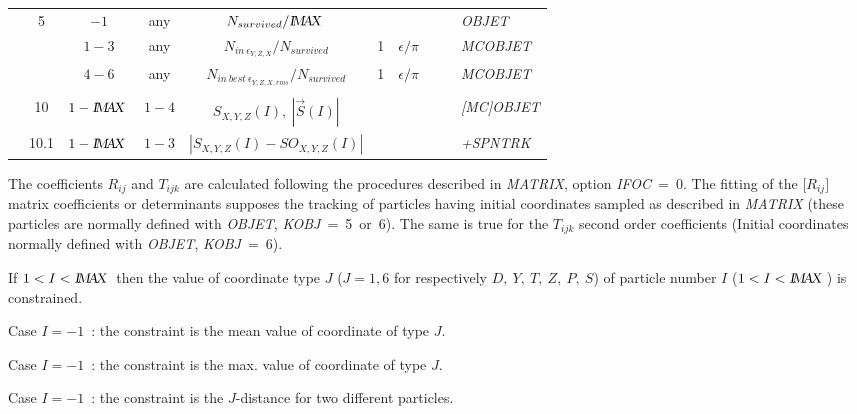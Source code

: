 \begin{center}
{\begin{tabular}{|>{\bfseries}p{\LL}|c|c|c|c|c|c|c|c|p{\LL}|}
			    & 5 & $-1$ & any &  $N_{survived}/\textsl{I\!M\!A\!X }$  
         & & & & & \textsl{OBJET} \\
			\multicolumn{1}{|c|}{\textbf{particles}} &  & $1 - 3$ & any 
                & $N_{in~\epsilon_{Y,Z,X}}/ N_{survived}$ 
         & 1 & $\epsilon/ \pi $& & & \textsl{MCOBJET}   \\
			    &  & $4 - 6$ & any 
                & $N_{in~best~\epsilon_{Y,Z,X,rms}}/ N_{survived}$ 
         & 1 & $\epsilon/ \pi $& & & \textsl{MCOBJET}   \\
                           & & & & & & & & &  \\
%
			\multicolumn{1}{|c|}{\textbf{Spin}}
			    & 10 & $1 - \textsl{I\!M\!A\!X }$ & $1 - 4$  & $  S_{X,Y,Z}(I), ~ |\vec S(I)| $  
         & & & & & \textsl{[MC]OBJET}   \\
			\multicolumn{1}{|c|}{\textbf{  }}
			    & 10.1 & $1 -\textsl{I\!M\!A\!X }$ & $1 -3$  &$|S_{X,Y,Z}(I) -SO_{X,Y,Z}(I)|$
         & & & & & \textsl{+SPNTRK}   \\
			\hline
			\hline
		\end{tabular}  }
	\end{center}
\normalsize


\smallskip


  The coefficients $ R_{ij} $ and $ T_{ijk} $ are calculated following
the procedures described in \textsl{MATRIX}, option \mbox{\textsl{IFOC} = 0}. 
The fitting of the $ \lbrack R_{ij}\rbrack $ matrix coefficients or
determinants supposes the tracking of particles having initial coordinates 
sampled as described in \textsl{MATRIX} (these particles are normally defined with 
\textsl{OBJET}, \mbox{\textsl{KOBJ} = 5 or 6}). The same is true for the $ T_{ijk} $
second order coefficients (Initial coordinates normally defined with \textsl{OBJET}, 
\mbox{\textsl{KOBJ} = 6}).  

\smallskip

 If $1<I<\textsl{I\!M\!A\!X }$ then the value of coordinate type $J$ ($J=1,6$ for respectively 
 $D,~Y,~T,~Z,~P,~S$) of particle number $I$ ($1<I<\textsl{I\!M\!A\!X }$) 
is constrained.  

Case $I=-1$~:  the constraint is the mean value of coordinate of type $J$. 

Case $I=-1$~:  the constraint is the max. value of coordinate of type $J$. 

Case $I=-1$~:  the constraint is the $J$-distance for two different particles. 

\smallskip

